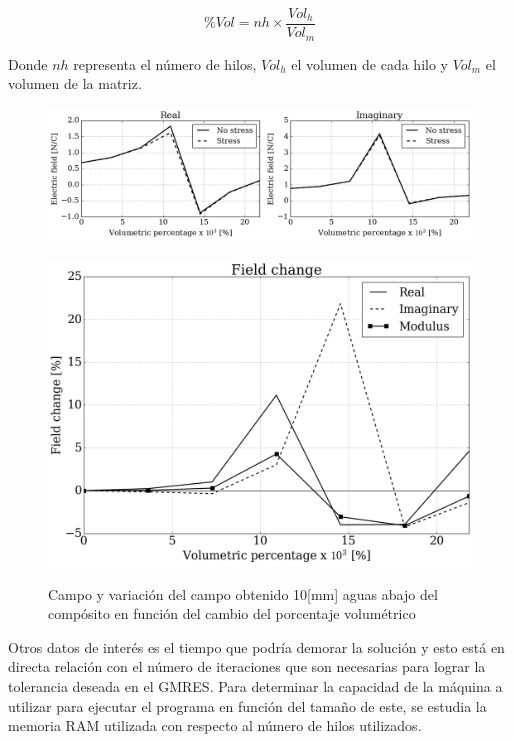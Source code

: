 \documentclass[12pt,letterpaper]{article}
\numberwithin{equation}{section}
\begin{document}
$$\%Vol = nh\times\frac{Vol_h}{Vol_m}$$

Donde $nh$ representa el número de hilos, $Vol_h$ el volumen de cada hilo y $Vol_m$ el volumen de la matriz. 

\begin{figure}[H]
	\centering\includegraphics[scale=0.6]{Imagenes/field_vol_comparision.png}\\
\end{figure} 
\begin{figure}[H]
	\centering\includegraphics[scale=0.35]{Imagenes/field_vol_change.png}\\
	\caption{Campo y variación del campo obtenido 10[mm] aguas abajo del compósito en función del cambio del porcentaje volumétrico}
	\label{fig:fieldvolchange}
\end{figure}

Otros datos de interés es el tiempo que podría demorar la solución y esto está en directa relación con el número de iteraciones que son necesarias para lograr la tolerancia deseada en el GMRES. Para determinar la capacidad de la máquina a utilizar para ejecutar el programa en función del tamaño de este, se estudia la memoria RAM utilizada con respecto al número de hilos utilizados.\\
\end{document}
